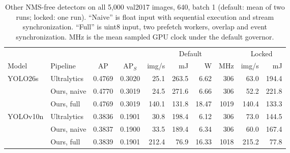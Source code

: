 \begin{table}[t]
\centering
\caption{Other NMS-free detectors on all 5,000 val2017 images, 640, batch 1
(default: mean of two runs; locked: one run). ``Naive'' is float input with sequential execution and
stream synchronization. ``Full'' is uint8 input, two prefetch workers, overlap
and event synchronization. MHz is the mean sampled GPU clock under the
default governor.}
\label{tab:generality}
\small
\setlength{\tabcolsep}{2.6pt}
\begin{tabular}{llcc rrrr rr}
\toprule
& & & & \multicolumn{4}{c}{Default} & \multicolumn{2}{c}{Locked} \\
\cmidrule(lr){5-8} \cmidrule(lr){9-10}
Model & Pipeline & AP & AP$_S$ & img/s & mJ & W & MHz & img/s & mJ \\
\midrule
YOLO26s & Ultralytics & 0.4769 & 0.3020 & 25.1 & 263.5 & 6.62 & 306 & 63.0 & 194.4 \\
 & Ours, naive & 0.4770 & 0.3019 & 24.5 & 271.6 & 6.66 & 306 & 52.2 & 221.8 \\
 & Ours, full & 0.4769 & 0.3019 & 140.1 & 131.8 & 18.47 & 1019 & 140.4 & 133.3 \\ \midrule
YOLOv10n & Ultralytics & 0.3836 & 0.1901 & 30.8 & 198.4 & 6.12 & 306 & 73.0 & 144.5 \\
 & Ours, naive & 0.3837 & 0.1900 & 33.5 & 189.4 & 6.34 & 306 & 60.0 & 167.4 \\
 & Ours, full & 0.3839 & 0.1901 & 212.4 & 76.9 & 16.33 & 1018 & 215.2 & 77.8 \\
\bottomrule
\end{tabular}
\end{table}
